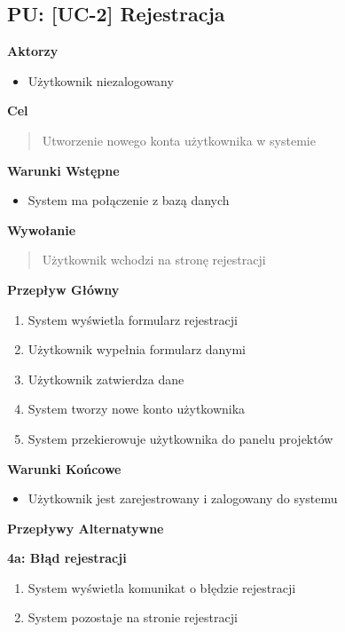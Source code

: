 \subsection*{PU: [UC-2] Rejestracja}

\noindent\textbf{Aktorzy}
\begin{itemize}
    \item Użytkownik niezalogowany
\end{itemize}

\vspace{0.2cm}
\noindent\textbf{Cel}
\begin{quote}
    Utworzenie nowego konta użytkownika w systemie
\end{quote}

\vspace{0.2cm}
\noindent\textbf{Warunki Wstępne}
\begin{itemize}
    \item System ma połączenie z bazą danych
\end{itemize}

\vspace{0.2cm}
\noindent\textbf{Wywołanie}
\begin{quote}
    Użytkownik wchodzi na stronę rejestracji
\end{quote}

\vspace{0.2cm}
\noindent\textbf{Przepływ Główny}
\begin{enumerate}
    \item System wyświetla formularz rejestracji
    \item Użytkownik wypełnia formularz danymi
    \item Użytkownik zatwierdza dane
    \item System tworzy nowe konto użytkownika
    \item System przekierowuje użytkownika do panelu projektów
\end{enumerate}

\vspace{0.2cm}
\noindent\textbf{Warunki Końcowe}
\begin{itemize}
    \item Użytkownik jest zarejestrowany i zalogowany do systemu
\end{itemize}

\vspace{0.2cm}
\noindent\textbf{Przepływy Alternatywne}

\textbf{4a: Błąd rejestracji}
\begin{enumerate}
    \item System wyświetla komunikat o błędzie rejestracji
    \item System pozostaje na stronie rejestracji
\end{enumerate}


